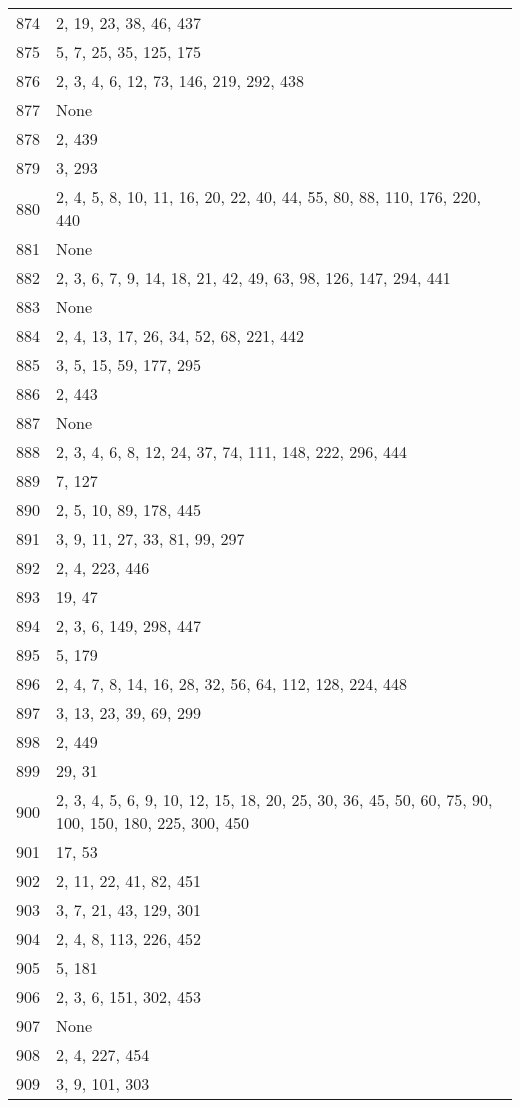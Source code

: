 \documentclass[12pt]{article}
\begin{document}
\begin{tabular}{|r|l|}
874 & 2, 19, 23, 38, 46, 437 \\ 
875 & 5, 7, 25, 35, 125, 175 \\ 
876 & 2, 3, 4, 6, 12, 73, 146, 219, 292, 438 \\ 
877 & None \\ 
878 & 2, 439 \\ 
879 & 3, 293 \\ 
880 & 2, 4, 5, 8, 10, 11, 16, 20, 22, 40, 44, 55, 80, 88, 110, 176, 220, 440 \\ 
881 & None \\ 
882 & 2, 3, 6, 7, 9, 14, 18, 21, 42, 49, 63, 98, 126, 147, 294, 441 \\ 
883 & None \\ 
884 & 2, 4, 13, 17, 26, 34, 52,  68, 221, 442 \\ 
885 & 3, 5, 15, 59, 177, 295 \\ 
886 & 2, 443 \\ 
887 & None \\ 
888 & 2, 3, 4, 6, 8, 12, 24, 37, 74, 111, 148, 222,  296, 444 \\ 
889 & 7, 127 \\ 
890 & 2, 5, 10, 89, 178, 445 \\ 
891 & 3, 9, 11, 27, 33, 81, 99, 297 \\ 
892 & 2, 4, 223, 446 \\ 
893 & 19, 47 \\ 
894 & 2, 3, 6, 149, 298, 447 \\ 
895 & 5, 179 \\ 
896 & 2, 4, 7, 8, 14, 16, 28, 32, 56, 64, 112, 128, 224, 448 \\ 
897 & 3, 13, 23, 39, 69, 299 \\ 
898 & 2,  449 \\ 
899 & 29, 31 \\ 
900 & 2, 3, 4, 5, 6, 9, 10, 12, 15, 18, 20, 25, 30, 36, 45, 50, 60, 75, 90, 100, 150, 180, 225, 300, 450 \\ 
901 & 17, 53 \\ 
902 & 2, 11,  22, 41, 82, 451 \\ 
903 & 3, 7, 21, 43, 129, 301 \\ 
904 & 2, 4, 8, 113, 226, 452 \\ 
905 & 5, 181 \\ 
906 & 2, 3, 6, 151, 302, 453 \\ 
907 & None \\ 
908 & 2, 4, 227, 454 \\ 
909 & 3, 9, 101, 303 \\ 

\end{tabular}
\end{document}
